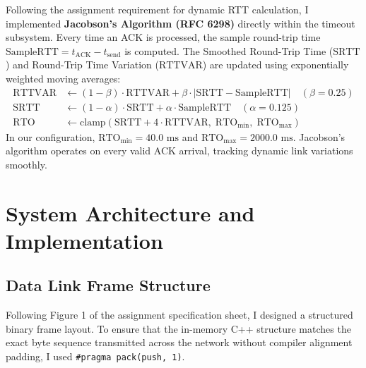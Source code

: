 \documentclass[11pt,a4paper]{article}
\begin{document}
Following the assignment requirement for dynamic RTT calculation, I implemented \textbf{Jacobson's Algorithm (RFC 6298)} directly within the timeout subsystem. Every time an ACK is processed, the sample round-trip time $\text{SampleRTT} = t_{\text{ACK}} - t_{\text{send}}$ is computed. The Smoothed Round-Trip Time ($\text{SRTT}$) and Round-Trip Time Variation ($\text{RTTVAR}$) are updated using exponentially weighted moving averages:
\begin{align}
    \text{RTTVAR} &\leftarrow (1 - \beta) \cdot \text{RTTVAR} + \beta \cdot |\text{SRTT} - \text{SampleRTT}| \quad (\beta = 0.25) \\
    \text{SRTT} &\leftarrow (1 - \alpha) \cdot \text{SRTT} + \alpha \cdot \text{SampleRTT} \quad (\alpha = 0.125) \\
    \text{RTO} &\leftarrow \text{clamp}\left(\text{SRTT} + 4 \cdot \text{RTTVAR}, \; \text{RTO}_{\min}, \; \text{RTO}_{\max}\right)
\end{align}
In our configuration, $\text{RTO}_{\min} = 40.0\text{ ms}$ and $\text{RTO}_{\max} = 2000.0\text{ ms}$. Jacobson's algorithm operates on every valid ACK arrival, tracking dynamic link variations smoothly.

\FloatBarrier
\section{System Architecture and Implementation}

\subsection{Data Link Frame Structure}
Following Figure 1 of the assignment specification sheet, I designed a structured binary frame layout. To ensure that the in-memory C++ structure matches the exact byte sequence transmitted across the network without compiler alignment padding, I used \texttt{\#pragma pack(push, 1)}.
\end{document}
